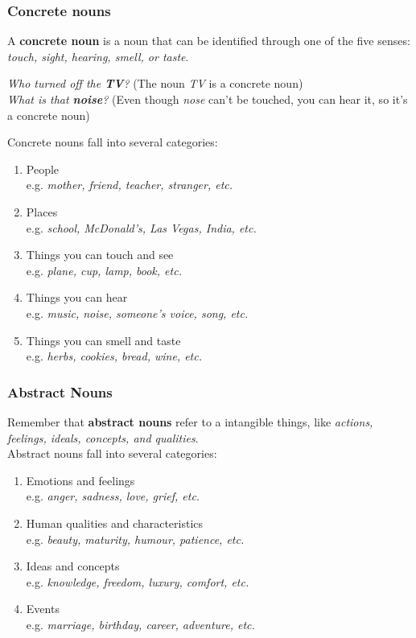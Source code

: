 \documentclass[hidelinks,10pt,a4paper]{article}
\begin{document}
\subsubsection{Concrete nouns}
A \textbf{concrete noun} is a noun that can be identified through one of the five senses: \textit{touch, sight, hearing, smell, or taste}.
\begin{center}
		\textit{Who turned off the \textbf{TV}?} (The noun \textit{TV} is a concrete noun)\\
		\textit{What is that \textbf{noise}?} (Even though \textit{nose} can't be touched, you can hear it, so it's a concrete noun)
\end{center}
Concrete nouns fall into several categories:
\begin{enumerate}[label=\alph*)]
		\item People\\
				e.g. \textit{mother, friend, teacher, stranger, etc.}
		\item Places\\
				e.g. \textit{school, McDonald's, Las Vegas, India, etc.}
		\item Things you can touch and see\\
				e.g. \textit{plane, cup, lamp, book, etc.}
		\item Things you can hear\\
				e.g. \textit{music, noise, someone's voice, song, etc.}
		\item Things you can smell and taste\\
				e.g. \textit{herbs, cookies, bread, wine, etc.}
\end{enumerate}

\subsubsection{Abstract Nouns}
Remember that \textbf{abstract nouns} refer to a intangible things, like \textit{actions, feelings, ideals, concepts, and qualities}.\\
Abstract nouns fall into several categories:
\begin{enumerate}[label=\alph*)]
		\item Emotions and feelings\\
				e.g. \textit{anger, sadness, love, grief, etc.}
		\item Human qualities and characteristics\\
				e.g. \textit{beauty, maturity, humour, patience, etc.}
		\item Ideas and concepts\\
				e.g. \textit{knowledge, freedom, luxury, comfort, etc.}
		\item Events\\
				e.g. \textit{marriage, birthday, career, adventure, etc.}
\end{enumerate}
\end{document}
